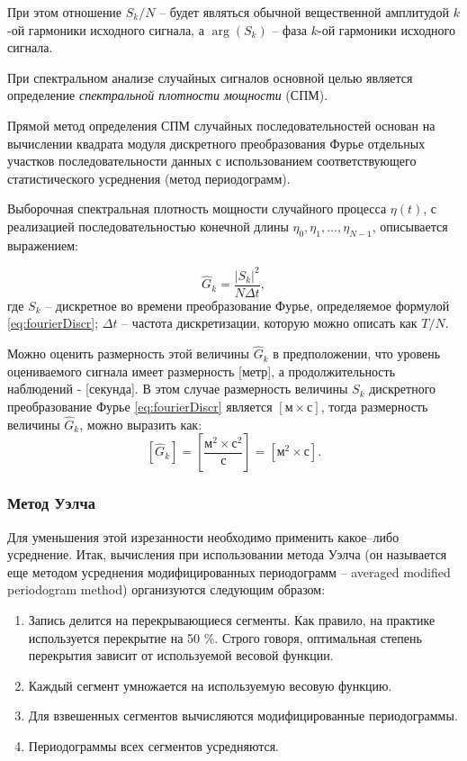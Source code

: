 При этом отношение $S_k/N$ -- будет являться обычной вещественной амплитудой $k$-ой гармоники исходного сигнала, а $\arg(S_k)$ -- фаза $k$-ой гармоники исходного сигнала.

При спектральном анализе случайных сигналов основной целью является определение \emph{спектральной плотности мощности} (СПМ).

Прямой метод определения СПМ случайных последовательностей основан на вычислении квадрата модуля дискретного преобразования Фурье отдельных участков последовательности данных с использованием соответствующего статистического усреднения (метод периодограмм).

Выборочная спектральная плотность мощности случайного процесса $\eta(t)$, с реализацией последовательностью конечной длины $\eta_0,\eta_1,...,\eta_{N-1}$, описывается выражением:

\begin{equation}\label{eq:psd}
  \hat{G}_k = \frac{|S_k|^2}{N\Delta t},
\end{equation}
\noindent
где $S_k$ -- дискретное во времени преобразование Фурье, определяемое формулой \eqref{eq:fourierDiscr}; $\Delta t$ -- частота дискретизации, которую можно описать как $T/N$.

Можно оценить размерность этой величины $\hat{G}_k$ в предположении, что уровень оцениваемого сигнала имеет размерность [метр], а продолжительность наблюдений - [секунда]. В этом случае размерность величины $S_k$ дискретного преобразование Фурье \eqref{eq:fourierDiscr} является $[\text{м}\times\text{с}]$, тогда размерность величины $\hat{G}_k$, можно выразить как:
$$
[\hat{G}_k]=\left[\frac{\text{м}^2\times\text{с}^2}{\text{с}}\right]=[\text{м}^2\times\text{с}].
$$


\subsubsection{Метод Уэлча }


Для уменьшения этой изрезанности необходимо применить какое--либо усреднение.
Итак, вычисления при использовании метода Уэлча (он называется еще методом усреднения модифицированных периодограмм -- averaged modified periodogram method) организуются следующим образом:

\begin{enumerate}
\item  Запись делится на перекрывающиеся сегменты. Как правило, на практике используется перекрытие на 50 \%. Строго говоря, оптимальная степень перекрытия зависит от используемой весовой функции.

\item  Каждый сегмент умножается на используемую весовую функцию.

\item  Для взвешенных сегментов вычисляются модифицированные периодограммы.

\item  Периодограммы всех сегментов усредняются.
\end{enumerate}

